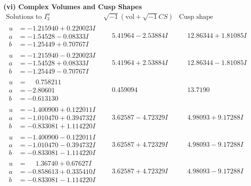 \documentclass[1p]{elsarticle_modified}
\theoremstyle{definition}
\newcommand{\I}{\sqrt{-1}}
\begin{document}
\newpage\flushleft \textbf{(vi) Complex Volumes and Cusp Shapes}
$$\begin{array}{c|c|c}  
\text{Solutions to }I^u_{3}& \I (\text{vol} + \sqrt{-1}CS) & \text{Cusp shape}\\
 \hline 
\begin{aligned}
u &= -1.215940 + 0.220023 I \\
a &= -1.54528 - 0.08333 I \\
b &= -1.25449 + 0.70767 I\end{aligned}
 & \phantom{-}5.41964 - 2.53884 I & \phantom{-}12.86344 + 1.81085 I \\ \hline\begin{aligned}
u &= -1.215940 - 0.220023 I \\
a &= -1.54528 + 0.08333 I \\
b &= -1.25449 - 0.70767 I\end{aligned}
 & \phantom{-}5.41964 + 2.53884 I & \phantom{-}12.86344 - 1.81085 I \\ \hline\begin{aligned}
u &= \phantom{-}0.758211\phantom{ +0.000000I} \\
a &= -2.80601\phantom{ +0.000000I} \\
b &= -0.613130\phantom{ +0.000000I}\end{aligned}
 & \phantom{-}0.459094\phantom{ +0.000000I} & \phantom{-}13.7190\phantom{ +0.000000I} \\ \hline\begin{aligned}
u &= -1.400900 + 0.122011 I \\
a &= -1.010470 + 0.394732 I \\
b &= -0.833081 + 1.114220 I\end{aligned}
 & \phantom{-}3.62587 - 4.72329 I & \phantom{-}4.98093 + 9.17288 I \\ \hline\begin{aligned}
u &= -1.400900 - 0.122011 I \\
a &= -1.010470 - 0.394732 I \\
b &= -0.833081 - 1.114220 I\end{aligned}
 & \phantom{-}3.62587 + 4.72329 I & \phantom{-}4.98093 - 9.17288 I \\ \hline\begin{aligned}
u &= \phantom{-}1.36740 + 0.67627 I \\
a &= -0.858613 + 0.335410 I \\
b &= -0.833081 - 1.114220 I\end{aligned}
 & \phantom{-}3.62587 + 4.72329 I & \phantom{-}4.98093 - 9.17288 I \\ \hline\begin{aligned}

\end{aligned}
\end{array}$$
\end{document}
